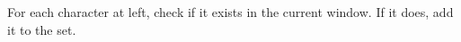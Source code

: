 \documentclass[preview]{standalone}
\begin{document}
For each character at left, check if it exists in the current window. If it does, add it to the set.\\
\end{document}
